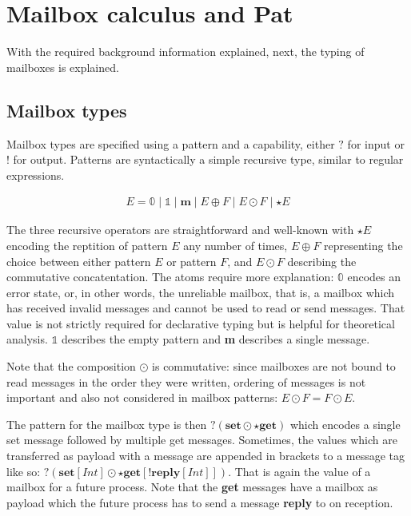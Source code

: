 \section{Mailbox calculus and Pat}
\label{sec:contentSummary}

With the required background information explained, next, the typing of mailboxes is explained.

\subsection{Mailbox types}

Mailbox types are specified using a pattern and a capability, either $?$ for input or $!$ for output. Patterns are syntactically a simple recursive type, similar to regular expressions.

\begin{align*}
    E = \mathbb{0} \mid \mathbb{1} \mid \textbf{m} \mid E \oplus F \mid E \odot F \mid \star E
\end{align*}

The three recursive operators are straightforward and well-known with $\star E$ encoding the reptition of pattern $E$ any number of times, $E \oplus F$ representing the choice between either pattern $E$ or pattern $F$, and $E \odot F$ describing the commutative concatentation. The atoms require more explanation: $\mathbb{0}$ encodes an error state, or, in other words, the unreliable mailbox, that is, a mailbox which has received invalid messages and cannot be used to read or send messages. That value is not strictly required for declarative typing but is helpful for theoretical analysis. $\mathbb{1}$ describes the empty pattern and \textbf{m} describes a single message.

Note that the composition $\odot$ is commutative: since mailboxes are not bound to read messages in the order they were written, ordering of messages is not important and also not considered in mailbox patterns: $E \odot F = F \odot E$.

The pattern for the mailbox type is then $?(\textbf{set} \odot \star \textbf{get})$ which encodes a single set message followed by multiple get messages. Sometimes, the values which are transferred as payload with a message are appended in brackets to a message tag like so: $?(\textbf{set}[Int] \odot \star \textbf{get}[!\textbf{reply}[Int]])$. That is again the value of a mailbox for a future process. Note that the \textbf{get} messages have a mailbox as payload which the future process has to send a message \textbf{reply} to on reception. 


